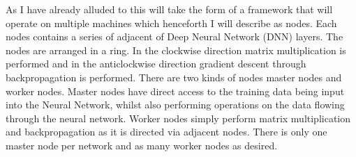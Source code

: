 As I have already alluded to this will take the form of a framework that will
operate on multiple machines which henceforth I will describe as nodes. Each
nodes contains a series of adjacent of Deep Neural Network (DNN) layers. The
nodes are arranged in a ring. In the clockwise direction matrix multiplication
is performed and in the anticlockwise direction gradient descent through
backpropagation is performed. There are two kinds of nodes master nodes and
worker nodes. Master nodes have direct access to the training data being input
into the Neural Network, whilst also performing operations on the data flowing
through the neural network. Worker nodes simply perform matrix multiplication
and backpropagation as it is directed via adjacent nodes. There is only one
master node per network and as many worker nodes as desired. 

